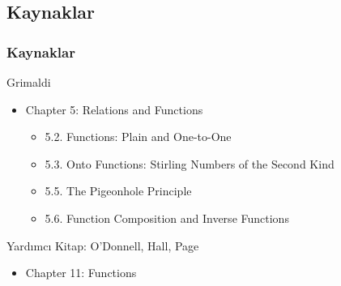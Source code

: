 \documentclass[dvipsnames]{beamer}
\theoremstyle{definition}
\theoremstyle{example}
\theoremstyle{plain}
\begin{document}
\subsection*{Kaynaklar}

\begin{frame}
  \frametitle{Kaynaklar}

  \begin{block}{Grimaldi}
    \begin{itemize}
      \item Chapter 5: Relations and Functions
      \begin{itemize}
        \item 5.2. \alert{Functions: Plain and One-to-One}
        \item 5.3. \alert{Onto Functions: Stirling Numbers of the Second Kind}
        \item 5.5. \alert{The Pigeonhole Principle}
        \item 5.6. \alert{Function Composition and Inverse Functions}
      \end{itemize}
    \end{itemize}
  \end{block}

  \begin{block}{Yardımcı Kitap: O'Donnell, Hall, Page}
    \begin{itemize}
      \item Chapter 11: Functions
    \end{itemize}
  \end{block}
\end{frame}
\end{document}

